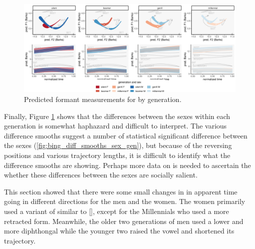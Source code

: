 \begin{figure}[p]
	\centering
	\includegraphics[angle = 90, origin = c, height = \textwidth]{Figures/BING/BING_sex_panel_plot_wide.pdf}
	\caption[Predicted formant measurements for \bing by generation.]{Predicted formant measurements for \bing by generation.}
	\label{fig:BING_sex_panel_plot_wide}
\end{figure}

Finally, Figure \ref{fig:BING_sex_panel_plot_wide} shows that the differences between the sexes within each generation is somewhat haphazard and difficult to interpret. The various difference smooths suggest a number of statistical significant difference between the sexes (\ref{fig:bing_diff_smooths_sex_gen}), but because of the reversing positions and various trajectory lengths, it is difficult to identify what the difference smooths are showing. Perhaps more data on \bing is needed to ascertain the whether these differences between the sexes are socially salient.

This section showed that there were some small changes in \bing in apparent time going in different directions for the men and the women. The women primarily used a variant of \bing similar to [], except for the Millennials who used a more retracted form. Meanwhile, the older two generations of men used a lower and more diphthongal \bing while the younger two raised the vowel and shortened its trajectory.







